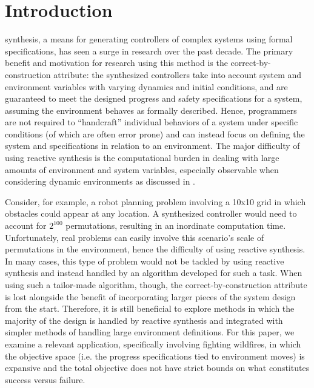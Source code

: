 \documentclass{ieeeaccess}
\begin{document}
\section{Introduction}
\label{sec:introduction}
 synthesis, a means for generating controllers of complex systems using formal specifications, has seen a surge in research over the past decade. The primary benefit and motivation for research using this method is the correct-by-construction attribute: the synthesized controllers take into account system and environment variables with varying dynamics and initial conditions, and are guaranteed to meet the designed progress and safety specifications for a system, assuming the environment behaves as formally described. Hence, programmers are not required to ``handcraft'' individual behaviors of a system under specific conditions (of which are often error prone) and can instead focus on defining the system and specifications in relation to an environment. The major difficulty of using reactive synthesis is the computational burden in dealing with large amounts of environment and system variables, especially observable when considering dynamic environments as discussed in \cite{c10}.

Consider, for example, a robot planning problem involving a 10x10 grid in which obstacles could appear at any location. A synthesized controller would need to account for $2^{100}$ permutations, resulting in an inordinate computation time. Unfortunately, real problems can easily involve this scenario's scale of permutations in the environment, hence the difficulty of using reactive synthesis. In many cases, this type of problem would not be tackled by using reactive synthesis and instead handled by an algorithm developed for such a task. When using such a tailor-made algorithm, though, the correct-by-construction attribute is lost alongside the benefit of incorporating larger pieces of the system design from the start. Therefore, it is still beneficial to explore methods in which the majority of the design is handled by reactive synthesis and integrated with simpler methods of handling large environment definitions. For this paper, we examine a relevant application, specifically involving fighting wildfires, in which the objective space (i.e. the progress specifications tied to environment moves) is expansive and the total objective does not have strict bounds on what constitutes success versus failure.
\end{document}
